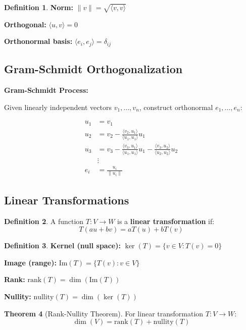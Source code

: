 \documentclass[12pt,a4paper]{article}
\theoremstyle{definition}
\newtheorem{theorem}{Theorem}[section]
\newtheorem{definition}[theorem]{Definition}
\begin{document}
\begin{definition}
\textbf{Norm:} $\|v\| = \sqrt{\langle v, v \rangle}$

\textbf{Orthogonal:} $\langle u, v \rangle = 0$

\textbf{Orthonormal basis:} $\langle e_i, e_j \rangle = \delta_{ij}$
\end{definition}

\subsection{Gram-Schmidt Orthogonalization}

\begin{importantbox}
\textbf{Gram-Schmidt Process:}

Given linearly independent vectors $v_1, \ldots, v_n$, construct orthonormal $e_1, \ldots, e_n$:

\begin{align}
u_1 &= v_1 \\
u_2 &= v_2 - \frac{\langle v_2, u_1 \rangle}{\langle u_1, u_1 \rangle}u_1 \\
u_3 &= v_3 - \frac{\langle v_3, u_1 \rangle}{\langle u_1, u_1 \rangle}u_1 - \frac{\langle v_3, u_2 \rangle}{\langle u_2, u_2 \rangle}u_2 \\
&\vdots \\
e_i &= \frac{u_i}{\|u_i\|}
\end{align}
\end{importantbox}

\subsection{Linear Transformations}

\begin{definition}
A function $T: V \to W$ is a \textbf{linear transformation} if:
\[
T(au + bv) = aT(u) + bT(v)
\]
\end{definition}

\begin{definition}
\textbf{Kernel (null space):} $\ker(T) = \{v \in V : T(v) = 0\}$

\textbf{Image (range):} $\text{Im}(T) = \{T(v) : v \in V\}$

\textbf{Rank:} $\text{rank}(T) = \dim(\text{Im}(T))$

\textbf{Nullity:} $\text{nullity}(T) = \dim(\ker(T))$
\end{definition}

\begin{theorem}[Rank-Nullity Theorem]
For linear transformation $T: V \to W$:
\[
\dim(V) = \text{rank}(T) + \text{nullity}(T)
\]
\end{theorem}
\end{document}
